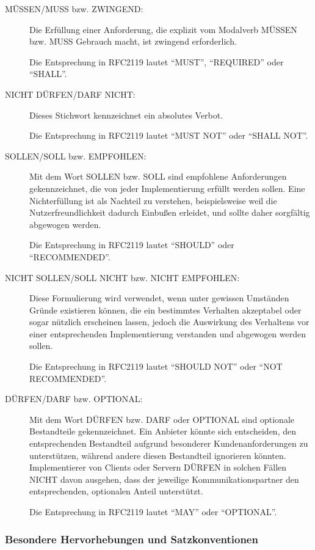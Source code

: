 \documentclass[,a4paper]{article}
\begin{document}
\begin{description}
\item[MÜSSEN/MUSS bzw. ZWINGEND:]
Die Erfüllung einer Anforderung, die explizit vom Modalverb MÜSSEN bzw.
MUSS Gebrauch macht, ist zwingend erforderlich.

Die Entsprechung in RFC2119 lautet ``MUST'', ``REQUIRED'' oder
``SHALL''.
\item[NICHT DÜRFEN/DARF NICHT:]
Dieses Stichwort kennzeichnet ein absolutes Verbot.

Die Entsprechung in RFC2119 lautet ``MUST NOT'' oder ``SHALL NOT''.
\item[SOLLEN/SOLL bzw. EMPFOHLEN:]
Mit dem Wort SOLLEN bzw. SOLL sind empfohlene Anforderungen
gekennzeichnet, die von jeder Implementierung erfüllt werden sollen.
Eine Nichterfüllung ist als Nachteil zu verstehen, beispielsweise weil
die Nutzerfreundlichkeit dadurch Einbußen erleidet, und sollte daher
sorgfältig abgewogen werden.

Die Entsprechung in RFC2119 lautet ``SHOULD'' oder ``RECOMMENDED''.
\item[NICHT SOLLEN/SOLL NICHT bzw. NICHT EMPFOHLEN:]
Diese Formulierung wird verwendet, wenn unter gewissen Umständen Gründe
existieren können, die ein bestimmtes Verhalten akzeptabel oder sogar
nützlich erscheinen lassen, jedoch die Auswirkung des Verhaltens vor
einer entsprechenden Implementierung verstanden und abgewogen werden
sollen.

Die Entsprechung in RFC2119 lautet ``SHOULD NOT'' oder ``NOT
RECOMMENDED''.
\item[DÜRFEN/DARF bzw. OPTIONAL:]
Mit dem Wort DÜRFEN bzw. DARF oder OPTIONAL sind optionale Bestandteile
gekennzeichnet. Ein Anbieter könnte sich entscheiden, den entsprechenden
Bestandteil aufgrund besonderer Kundenanforderungen zu unterstützen,
während andere diesen Bestandteil ignorieren könnten. Implementierer von
Clients oder Servern DÜRFEN in solchen Fällen NICHT davon ausgehen, dass
der jeweilige Kommunikationspartner den entsprechenden, optionalen
Anteil unterstützt.

Die Entsprechung in RFC2119 lautet ``MAY'' oder ``OPTIONAL''.
\end{description}

\subsubsection{Besondere Hervorhebungen und
Satzkonventionen}\label{besondere-hervorhebungen-und-satzkonventionen}
\end{document}
